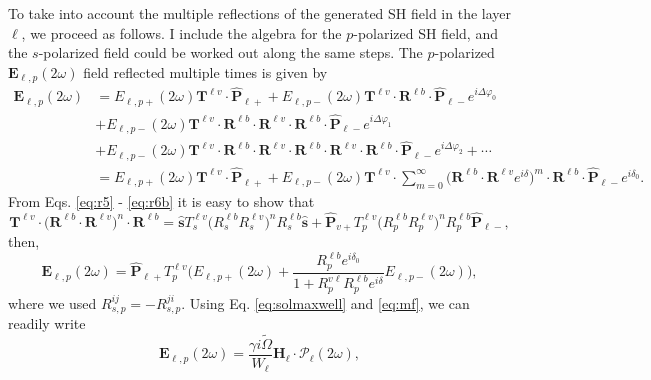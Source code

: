 To take into account the multiple reflections of the generated SH field in the
layer $\ell$, we proceed as follows. I include the algebra for the $p$-polarized
SH field, and the $s$-polarized field could be worked out along the same steps.
The $p$-polarized $\mathbf{E}_{\ell,p}(2\omega)$ field reflected multiple times
is given by
\begin{equation}\label{eq:E2wcomplete}
\begin{split}
\mathbf{E}_{\ell,p}(2\omega) 
&= E_{\ell,p+}(2\omega)\mathbf{T}^{\ell v}\cdot\hat{\mathbf{P}}_{\ell +}
 + E_{\ell,p-}(2\omega)\mathbf{T}^{\ell v}
\cdot\mathbf{R}^{\ell b}\cdot\hat{\mathbf{P}}_{\ell-}e^{i\Delta\varphi_{0}}\\
&+ E_{\ell,p-}(2\omega)\mathbf{T}^{\ell v}
\cdot\mathbf{R}^{\ell b}\cdot\mathbf{R}^{\ell v}
\cdot\mathbf{R}^{\ell b}\cdot\hat{\mathbf{P}}_{\ell-}e^{i\Delta\varphi_{1}}
\\
&+ E_{\ell,p-}(2\omega)\mathbf{T}^{\ell v}
\cdot\mathbf{R}^{\ell b}\cdot\mathbf{R}^{\ell v}
\cdot\mathbf{R}^{\ell b}\cdot\mathbf{R}^{\ell v}
\cdot\mathbf{R}^{\ell b}\cdot\hat{\mathbf{P}}_{\ell-}e^{i\Delta\varphi_{2}}
+\cdots\\
&= E_{\ell,p+}(2\omega)\mathbf{T}^{\ell v}\cdot\hat{\mathbf{P}}_{\ell +}
+ E_{\ell,p-}(2\omega) \mathbf{T}^{\ell v}
\cdot\sum_{m=0}^\infty  
\big(
\mathbf{R}^{\ell b}\cdot\mathbf{R}^{\ell v} 
e^{i\delta}\Big)^m 
\cdot\mathbf{R}^{\ell b}\cdot\hat{\mathbf{P}}_{\ell-}e^{i\delta_{0}}.
\end{split}
\end{equation}
From Eqs. \eqref{eq:r5} - \eqref{eq:r6b} it is easy to show that
\begin{equation*}\label{eq:m1}
\mathbf{T}^{\ell v}\cdot
\Big(\mathbf{R}^{\ell b}\cdot\mathbf{R}^{\ell v}\Big)^{n}\cdot
\mathbf{R}^{\ell b}
= \hat{\mathbf{s}}T^{\ell v}_{s}
  \Big(R^{\ell b}_{s}R^{\ell v}_{s}\Big)^{n}R^{\ell b}_{s}\hat{\mathbf{s}}
+ \hat{\mathbf{P}}_{v+}T^{\ell v}_{p}\Big(R^{\ell b}_{p}R^{\ell v}_{p}\Big)^n 
  R^{\ell b}_{p} 
\hat{\mathbf{P}}_{\ell-},
\end{equation*}
then,
\begin{equation}\label{eq:E2wreduced}
\mathbf{E}_{\ell,p}(2\omega) 
= \hat{\mathbf{P}}_{\ell +}T^{\ell v}_{p}
\Big(
E_{\ell,p+}(2\omega) +
\frac{R^{\ell b}_{p}e^{i\delta_{0}}}{1 + R^{v\ell}_{p}R^{\ell b}_{p}e^{i\delta}}
E_{\ell,p-}(2\omega) 
\Big),
\end{equation}
where we used $R^{ij}_{s,p} = -R^{ji}_{s,p}$. Using Eq. \eqref{eq:solmaxwell}
and \eqref{eq:mf}, we can readily write
\begin{equation}\label{eq:mr8}
\mathbf{E}_{\ell,p}(2\omega) =
\frac{\gamma i\tilde{\Omega}}{W_{\ell}}\mathbf{H}_{\ell}\cdot
\boldsymbol{\mathcal{P}}_{\ell}(2\omega),
\end{equation}
